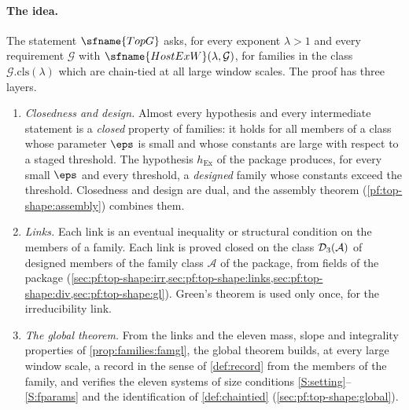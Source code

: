 \paragraph{The idea.}
The statement $\sfname{TopG}$ asks, for every exponent $\lambda>1$ and every requirement $\mathcal G$ with
$\sfname{HostExW}(\lambda,\mathcal G)$, for families in the class $\mathcal G.\mathrm{cls}(\lambda)$ which
are chain-tied at all large window scales. The proof has three layers.
\begin{enumerate}[label=(\roman*)]
\item \emph{Closedness and design.} Almost every hypothesis and every intermediate statement is a
\emph{closed} property of families: it holds for all members of a class whose parameter $\eps$ is small and
whose constants are large with respect to a staged threshold. The hypothesis $h_{\mathrm{Ex}}$ of the package
produces, for every small $\eps$ and every threshold, a \emph{designed} family whose constants exceed the
threshold. Closedness and design are dual, and the assembly theorem (\cref{pf:top-shape:assembly}) combines them.
\item \emph{Links.} Each link is an eventual inequality or structural condition on the members of a family.
Each link is proved closed on the class $\mathcal{D}_3(\mathcal A)$ of designed members of the family class
$\mathcal A$ of the package, from fields of the package (\cref{sec:pf:top-shape:irr,sec:pf:top-shape:links,sec:pf:top-shape:div,sec:pf:top-shape:gl}).
Green's theorem is used only once, for the irreducibility link.
\item \emph{The global theorem.} From the links and the eleven mass, slope and integrality properties of
\cref{prop:families:famgl}, the global theorem builds, at every large window scale, a record in the sense of
\cref{def:record} from the members of the family, and verifies the eleven systems of size conditions
\ref{S:setting}--\ref{S:fparams} and the identification of \cref{def:chaintied}
(\cref{sec:pf:top-shape:global}).
\end{enumerate}

